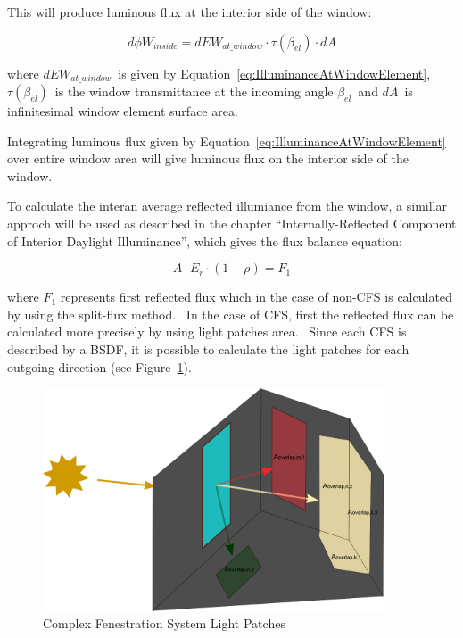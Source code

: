 This will produce luminous flux at the interior side of the window:

\begin{equation}
d\phi {W_{inside}} = dE{W_{at\_window}} \cdot \tau ({\beta_{el}}) \cdot dA
\end{equation}

where \(dE{W_{at\_window}}\)~is given by Equation~\ref{eq:IlluminanceAtWindowElement}, \(\tau ({\beta_{el}})\)~is the window transmittance at the incoming angle \({\beta_{el}}\)~and \(dA\)~is infinitesimal window element surface area.

Integrating luminous flux given by Equation~\ref{eq:IlluminanceAtWindowElement} over entire window area will give luminous flux on the interior side of the window.

To calculate the interan average reflected illumiance from the window, a simillar approch will be used as described in the chapter ``Internally-Reflected Component of Interior Daylight Illuminance'', which gives the flux balance equation:

\begin{equation}
A \cdot {E_r} \cdot (1 - \rho ) = {F_1}
\end{equation}

where \({F_1}\) represents first reflected flux which in the case of non-CFS is calculated by using the split-flux method.~ In the case of CFS, first the reflected flux can be calculated more precisely by using light patches area.~ Since each CFS is described by a BSDF, it is possible to calculate the light patches for each outgoing direction (see Figure~\ref{fig:complex-fenestration-system-light-patches}).

\begin{figure}[hbtp] %
\centering
\includegraphics[width=0.9\textwidth, height=0.9\textheight, keepaspectratio=true]{media/image842.png}
\caption{Complex Fenestration System Light Patches \protect \label{fig:complex-fenestration-system-light-patches}}
\end{figure}


